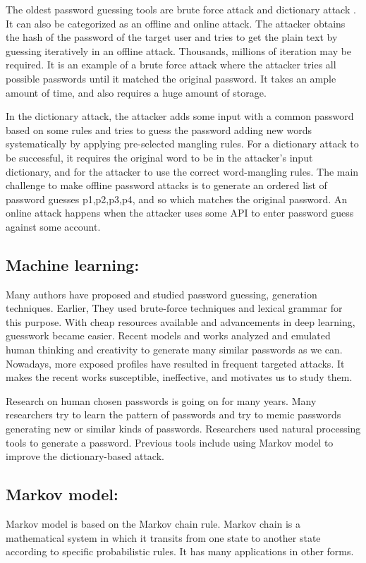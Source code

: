 \documentclass[runningheads]{llncs}
\begin{document}
The oldest password guessing tools are brute force attack \cite{8400211} and dictionary attack \cite{8400211}. It can also be categorized as an offline and online attack. The attacker obtains the hash of the password of the target user and tries to get the plain text by guessing iteratively in an offline attack. Thousands, millions of iteration may be required. It is an example of a brute force attack where the attacker tries all possible passwords until it matched the original password. It takes an ample amount of time, and also requires a huge amount of storage. 
\par
In the dictionary attack, the attacker adds some input with a common password based on some rules and tries to guess the password adding new words systematically by applying pre-selected mangling rules. For a dictionary attack to be successful, it requires the original word to be in the attacker's input dictionary, and for the attacker to use the correct word-mangling rules. The main challenge to make offline password attacks is to generate an ordered list of password guesses p1,p2,p3,p4, and so which matches the original password. An online attack happens when the attacker uses some API to enter password guess against some account. 
\newline
\subsection{\textbf{Machine learning:}}
Many authors have proposed and studied password guessing, generation techniques. Earlier, They used brute-force techniques and lexical grammar for this purpose. With cheap resources available and advancements in deep learning, guesswork became easier. Recent models and works analyzed and emulated human thinking and creativity to generate many similar passwords as we can. Nowadays, more exposed profiles have resulted in frequent targeted attacks. It makes the recent works susceptible, ineffective, and motivates us to study them. 

Research on human chosen passwords is going on for many years. Many researchers try to learn the pattern of passwords and try to memic passwords generating new or similar kinds of passwords. Researchers used natural processing tools to generate a password. Previous tools include using Markov model \cite{Narayanan:2005:FDA:1102120.1102168} to improve the dictionary-based attack.
\newline
\\
\subsection{\textbf{Markov model:}}
\newline
Markov model is based on the Markov chain rule. Markov chain is a mathematical system in which it transits from one state to another state according to specific probabilistic rules. It has many applications in other forms. 
\end{document}
